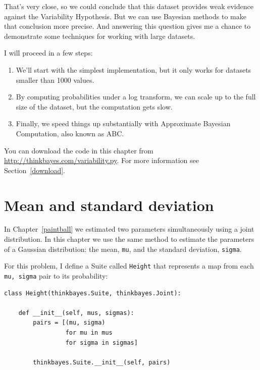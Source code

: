 \documentclass[12pt]{book}
\begin{document}
That's very close, so we could conclude that this dataset provides
weak evidence against the Variability Hypothesis.  But we can use
Bayesian methods to make that conclusion more precise.  And answering
this question gives me a chance to demonstrate some techniques
for working with large datasets.

I will proceed in a few steps:

\begin{enumerate}

\item We'll start with the simplest implementation, but it only works
  for datasets smaller than 1000 values.

\item By computing probabilities under a log transform, we can scale
  up to the full size of the dataset, but the computation gets slow.

\item Finally, we speed things up substantially with Approximate
  Bayesian Computation, also known as ABC.

\end{enumerate}

You can download the code in this chapter from
\url{http://thinkbayes.com/variability.py}.
  For more information
see Section~\ref{download}.

\section{Mean and standard deviation}

In Chapter~\ref{paintball} we estimated two parameters simultaneously
using a joint distribution.  In this chapter we use the same
method to estimate the parameters of a Gaussian distribution:
the mean, {\tt mu}, and the standard deviation, {\tt sigma}.

For this problem, I define a Suite called {\tt Height} that
represents a map from each {\tt mu, sigma} pair to its probability:

\begin{verbatim}
class Height(thinkbayes.Suite, thinkbayes.Joint):

    def __init__(self, mus, sigmas):
        pairs = [(mu, sigma) 
                 for mu in mus
                 for sigma in sigmas]

        thinkbayes.Suite.__init__(self, pairs)
\end{verbatim}
\end{document}
